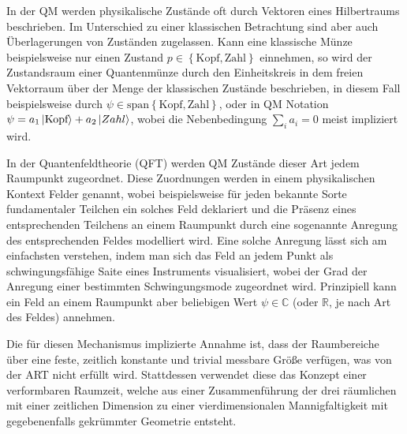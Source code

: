 In der QM werden physikalische Zustände oft durch Vektoren eines
Hilbertraums beschrieben. Im Unterschied zu einer klassischen
Betrachtung sind aber auch Überlagerungen von Zuständen
zugelassen. Kann eine klassische Münze beispielsweise nur einen
Zustand $p \in \left\lbrace \textrm{Kopf}, \textrm{Zahl}\right\rbrace$
einnehmen, so wird der Zustandsraum einer Quantenmünze durch den
Einheitskreis in dem freien Vektorraum über der Menge der klassischen
Zustände beschrieben, in diesem Fall beispielsweise durch $\psi \in
\textrm{span} \left\lbrace \textrm{Kopf}, \textrm{Zahl}\right\rbrace$,
oder in QM Notation $\psi = a_1 \left\vert \textrm{Kopf}\right> + a_2 \left\vert Zahl\right>$,
wobei die Nebenbedingung $\sum_i a_i = 0$ meist impliziert wird.

In der Quantenfeldtheorie (QFT) werden QM Zustände dieser Art jedem
Raumpunkt zugeordnet. Diese Zuordnungen werden in einem physikalischen
Kontext Felder genannt, wobei beispielsweise für jeden bekannte Sorte
fundamentaler Teilchen ein solches Feld deklariert und die Präsenz
eines entsprechenden Teilchens an einem Raumpunkt durch eine
sogenannte \glqq Anregung\grqq{} des entsprechenden Feldes modelliert
wird. Eine solche Anregung lässt sich am einfachsten verstehen, indem
man sich das Feld an jedem Punkt als schwingungsfähige Saite eines
Instruments visualisiert, wobei der Grad der Anregung einer bestimmten
Schwingungsmode zugeordnet wird. Prinzipiell kann ein Feld an einem
Raumpunkt aber beliebigen Wert $\psi\in\mathbb{C}$ (oder $\mathbb{R}$,
je nach Art des Feldes) annehmen.

Die für diesen Mechanismus implizierte Annahme ist, dass der
Raumbereiche über eine feste, zeitlich konstante und trivial messbare
Größe verfügen, was von der ART nicht erfüllt wird. Stattdessen
verwendet diese das Konzept einer verformbaren Raumzeit, welche aus
einer Zusammenführung der drei räumlichen mit einer zeitlichen
Dimension zu einer vierdimensionalen Mannigfaltigkeit mit
gegebenenfalls gekrümmter Geometrie entsteht.
